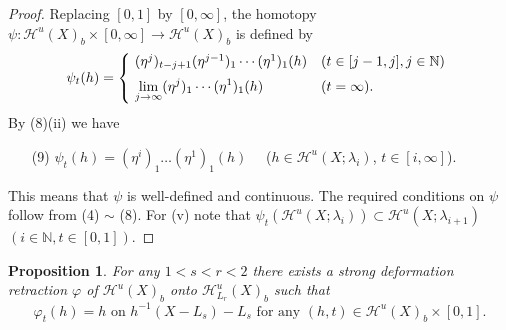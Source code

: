 \documentclass[11pt, fleqn]{amsart}
\newtheorem{proposition}{Proposition}[section]
\theoremstyle{definition}
\newcommand{\ds}{\displaystyle}
\newcommand{\cal}{\mathcal}
\renewcommand{\phi}{\varphi}
\newcommand{\lra}{\longrightarrow}
\newcommand{\IN}{\mathbb N}
\begin{document}
\begin{proof}
Replacing $[0,1]$ by $[0, \infty]$, the homotopy $\psi : {\cal H}^u(X)_b \times [0,\infty] \lra {\cal H}^u(X)_b$ is defined by 
\vspace{1mm} 
$$\psi_t(h) = \left\{ \begin{array}[c]{@{\ }ll}
(\eta^j)_{t -j+1} (\eta^{j-1})_1 \cdots (\eta^1)_1(h) & (t \in [j-1, j], j \in \IN) \\[2mm] 
\ds \lim_{j \to \infty}(\eta^j)_1 \cdots (\eta^1)_1(h) & (t = \infty). 
\end{array} \right.$$
\vskip 1mm 
\noindent By (8)(ii) we have 
\begin{itemize}
\item[(9)] $\psi_t(h) = (\eta^i)_1 \dots (\eta^1)_1(h)$ \ \ ($h \in {\cal H}^u(X;\lambda_i)$, $t \in [i, \infty]$). 
\end{itemize}
This means that $\psi$ is well-defined and continuous. The required conditions on $\psi$ follow from (4) $\sim$ (8). 
For (v) note that $\psi_t({\cal H}^u(X; \lambda_i)) \subset {\cal H}^u(X; \lambda_{i+1})$ $(i \in \IN, t \in [0,1])$. 
\end{proof}

\begin{proposition}\label{prop_deform_homeo} 
For any $1 < s < r < 2$ there exists a strong deformation retraction $\phi$ of ${\cal H}^u(X)_b$ onto ${\cal H}^u_{L_r}(X)_b$ such that 
$$\mbox{$\phi_t(h) = h$ \ on \ $h^{-1}(X - L_s) - L_s$ \ \ for any \ $(h,t) \in {\cal H}^u(X)_b \times [0,1]$.}$$  
\end{proposition}
\end{document}
